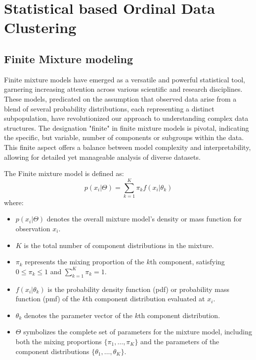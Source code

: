 \documentclass{article}
\begin{document}
\section{Statistical based Ordinal Data Clustering}

\subsection{Finite Mixture modeling}

Finite mixture models have emerged as a versatile and powerful statistical tool, garnering increasing attention across various scientific and research disciplines. These models, predicated on the assumption that observed data arise from a blend of several probability distributions, each representing a distinct subpopulation, have revolutionized our approach to understanding complex data structures. The designation "finite" in finite mixture models is pivotal, indicating the specific, but variable, number of components or subgroups within the data. This finite aspect offers a balance between model complexity and interpretability, allowing for detailed yet manageable analysis of diverse datasets.

The Finite mixture model is defined as:
\begin{equation}
p(x_i|\Theta) = \sum_{k=1}^{K} \pi_k f(x_i|\theta_k)
\end{equation}
where:
\begin{itemize}
    \item $p(x_i|\Theta)$ denotes the overall mixture model's density or mass function for observation $x_i$.
    \item $K$ is the total number of component distributions in the mixture.
    \item $\pi_k$ represents the mixing proportion of the $k$th component, satisfying $0 \leq \pi_k \leq 1$ and $\sum_{k=1}^{K} \pi_k = 1$.
    \item $f(x_i|\theta_k)$ is the probability density function (pdf) or probability mass function (pmf) of the $k$th component distribution evaluated at $x_i$.
    \item $\theta_k$ denotes the parameter vector of the $k$th component distribution.
    \item $\Theta$ symbolizes the complete set of parameters for the mixture model, including both the mixing proportions $\{\pi_1, \ldots, \pi_K\}$ and the parameters of the component distributions $\{\theta_1, \ldots, \theta_K\}$.
\end{itemize}
\end{document}
